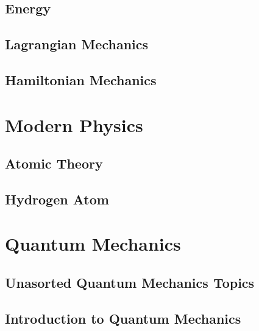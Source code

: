 \documentclass[10pt]{report}
\begin{document}
\section{Energy}
\clearpage

\section{Lagrangian Mechanics}
\clearpage
\clearpage

\section{Hamiltonian Mechanics}
\clearpage
\clearpage

\chapter{Modern Physics}\clearpage

\section{Atomic Theory}
\clearpage
\clearpage

\section{Hydrogen Atom}
\clearpage

\chapter{Quantum Mechanics}\clearpage
\section{Unasorted Quantum Mechanics Topics}
\clearpage
\clearpage

\section{Introduction to Quantum Mechanics}
\clearpage
\end{document}
